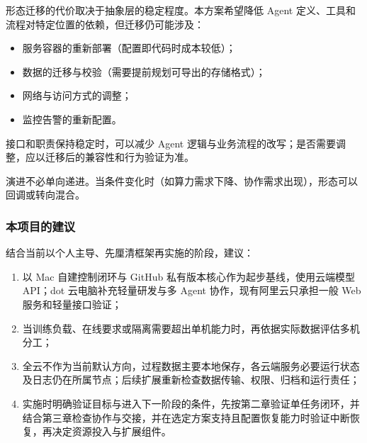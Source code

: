 \documentclass[11pt,a4paper]{article}
\begin{document}
形态迁移的代价取决于抽象层的稳定程度。本方案希望降低 Agent 定义、工具和流程对特定位置的依赖，但迁移仍可能涉及：

\begin{itemize}[leftmargin=2em,itemsep=2pt]
  \item 服务容器的重新部署（配置即代码时成本较低）；
  \item 数据的迁移与校验（需要提前规划可导出的存储格式）；
  \item 网络与访问方式的调整；
  \item 监控告警的重新配置。
\end{itemize}

接口和职责保持稳定时，可以减少 Agent 逻辑与业务流程的改写；是否需要调整，应以迁移后的兼容性和行为验证为准。

演进不必单向递进。当条件变化时（如算力需求下降、协作需求出现），形态可以回调或转向混合。

\subsubsection{本项目的建议}

结合当前以个人主导、先厘清框架再实施的阶段，建议：

\begin{enumerate}[leftmargin=2em,itemsep=4pt]
  \item 以 Mac 自建控制闭环与 GitHub 私有版本核心作为起步基线，使用云端模型 API；dot 云电脑补充轻量研发与多 Agent 协作，现有阿里云只承担一般 Web 服务和轻量接口验证；
  \item 当训练负载、在线要求或隔离需要超出单机能力时，再依据实际数据评估多机分工；
  \item 全云不作为当前默认方向，过程数据主要本地保存，各云端服务必要运行状态及日志仍在所属节点；后续扩展重新检查数据传输、权限、归档和运行责任；
  \item 实施时明确验证目标与进入下一阶段的条件，先按第二章验证单任务闭环，并结合第三章检查协作与交接，并在选定方案支持且配置恢复能力时验证中断恢复，再决定资源投入与扩展组件。
\end{enumerate}


\endgroup

\newpage
\end{document}
